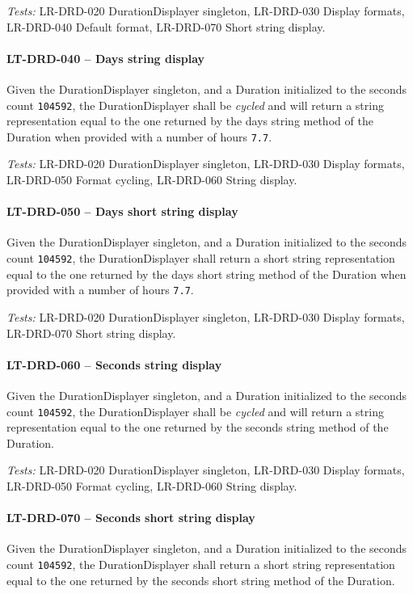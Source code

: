 \textit{Tests: } LR-DRD-020 DurationDisplayer singleton,
LR-DRD-030 Display formats, LR-DRD-040 Default format, LR-DRD-070 Short string
display.

\paragraph{LT-DRD-040 -- Days string display}
Given the DurationDisplayer singleton, and a Duration initialized
to the seconds count \lstinline{104592}, the DurationDisplayer
shall be \emph{cycled} and will return a string representation equal to
the one returned by the days string method of the Duration when provided
with a number of hours \lstinline{7.7}.

\textit{Tests: } LR-DRD-020 DurationDisplayer singleton,
LR-DRD-030 Display formats, LR-DRD-050 Format cycling, LR-DRD-060 String
display.

\paragraph{LT-DRD-050 -- Days short string display}
Given the DurationDisplayer singleton, and a Duration initialized
to the seconds count \lstinline{104592}, the DurationDisplayer
shall return a short string representation equal to
the one returned by the days short string method of the Duration when provided
with a number of hours \lstinline{7.7}.

\textit{Tests: } LR-DRD-020 DurationDisplayer singleton,
LR-DRD-030 Display formats, LR-DRD-070 Short string
display.

\paragraph{LT-DRD-060 -- Seconds string display}
Given the DurationDisplayer singleton, and a Duration initialized
to the seconds count \lstinline{104592}, the DurationDisplayer
shall be \emph{cycled} and will return a string representation equal to
the one returned by the seconds string method of the Duration.

\textit{Tests: } LR-DRD-020 DurationDisplayer singleton,
LR-DRD-030 Display formats, LR-DRD-050 Format cycling, LR-DRD-060 String
display.

\paragraph{LT-DRD-070 -- Seconds short string display}
Given the DurationDisplayer singleton, and a Duration initialized
to the seconds count \lstinline{104592}, the DurationDisplayer
shall return a short string representation equal to
the one returned by the seconds short string method of the Duration.

